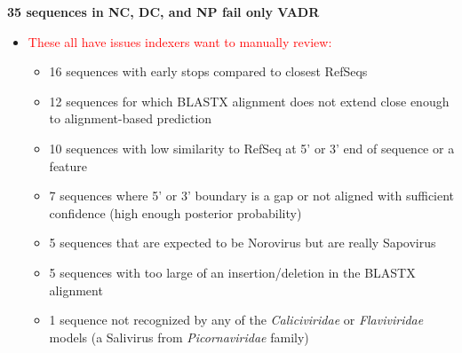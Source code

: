 \documentclass[landscape]{slides}
\begin{document}
\begin{slide}
\begin{center}
\textbf{35 sequences in NC, DC, and NP fail only VADR}

\small
\begin{itemize}
\item \textcolor{red}{These all have issues indexers want to manually review:}
\begin{itemize}
\item 16 sequences with early stops compared to closest RefSeqs %
\item 12 sequences for which BLASTX alignment does not extend close
  enough to alignment-based prediction %
\item 10 sequences with low similarity to RefSeq at 5' or 3' end of
  sequence or a feature %
\item 7 sequences where 5' or 3' boundary is a gap or not aligned with
  sufficient confidence (high enough posterior probability)
\item 5 sequences that are expected to be Norovirus but are really Sapovirus
\item 5 sequences with too large of an insertion/deletion in the
  BLASTX alignment %
\item 1 sequence not recognized by any of the \emph{Caliciviridae} or
  \emph{Flaviviridae} models (a Salivirus from \emph{Picornaviridae}
  family) %
\end{itemize}
\end{itemize}
\end{center}

\vfill
\end{slide}
\end{document}
